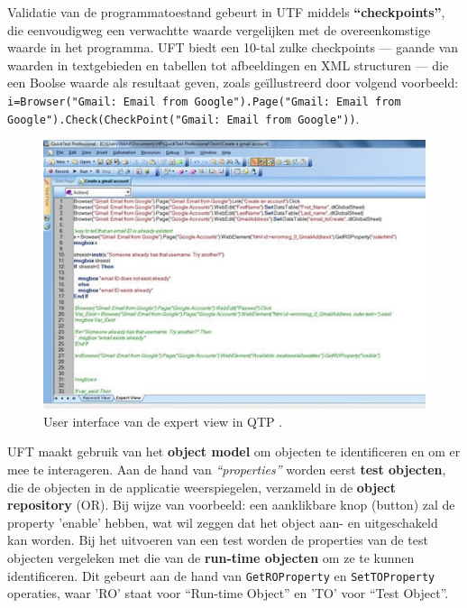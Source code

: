 Validatie van de programmatoestand gebeurt in UTF middels \textbf{``checkpoints''}, die eenvoudigweg een verwachtte waarde vergelijken met de overeenkomstige waarde in het programma. UFT biedt een 10-tal zulke checkpoints — gaande van waarden in textgebieden en tabellen tot afbeeldingen en XML structuren — die een Boolse waarde als resultaat geven, zoals geïllustreerd door volgend voorbeeld: \texttt{i=Browser("Gmail: Email from Google").Page("Gmail: Email from Google").Check(CheckPoint("Gmail: Email from Google"))}. \autocite{SoftwareTestingHelpStepGenerator}

\begin{figure}[h!]
    \centering
    \includegraphics[scale=0.8]{img/SoftwareTestingHelpQTPExpertView.jpg}
    \caption{User interface van de expert view in QTP \autocite{SoftwareTestingHelpStepGenerator}.}
    \label{fig:utfexpertview}
\end{figure}

UFT maakt gebruik van het \textbf{object model} om objecten te identificeren en om er mee te interageren. Aan de hand van \emph{``properties''} worden eerst \textbf{test objecten}, die de objecten in de applicatie weerspiegelen, verzameld in de \textbf{object repository} (OR). Bij wijze van voorbeeld: een aanklikbare knop (button) zal de property 'enable' hebben, wat wil zeggen dat het object aan- en uitgeschakeld kan worden. Bij het uitvoeren van een test worden de properties van de test objecten  vergeleken met die van de \textbf{run-time objecten} om ze te kunnen identificeren. Dit gebeurt aan de hand van \texttt{GetROProperty} en \texttt{SetTOProperty} operaties, waar 'RO' staat voor ``Run-time Object'' en 'TO' voor ``Test Object''. \autocite{TutorialspointQTPQuickGuide,LearnQTP2017ObjectRepo,Saket2013}

